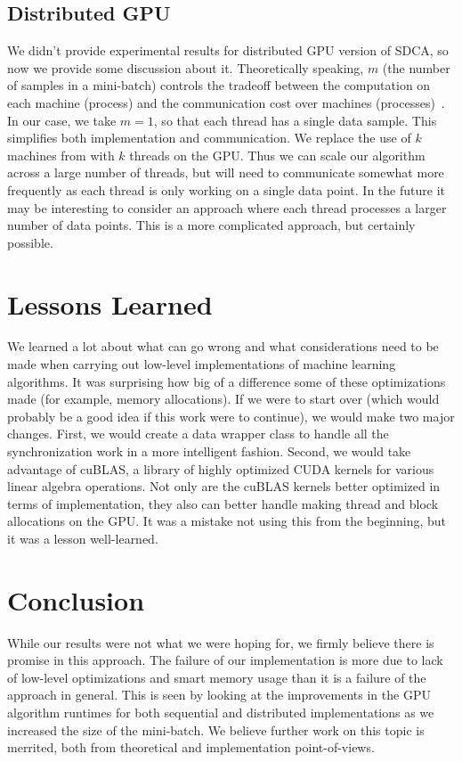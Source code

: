 \documentclass{article}
\begin{document}
\subsection{Distributed GPU}
We didn't provide experimental results for distributed GPU version of SDCA, so
now we provide some discussion about it. Theoretically speaking, $m$ (the
number of samples in a mini-batch) controls the tradeoff between the
computation on each machine (process) 
and the communication cost over machines
(processes)~\cite{yang2013trading,yang2013analysis}. In our case, we take $m =
1$, so that each thread has a single data sample. This simplifies both
implementation and communication. We replace the use of $k$
machines from \cite{yang2013trading} with $k$ threads on the GPU. Thus we can
scale our algorithm across a large number of threads, but will need to
communicate somewhat more frequently as each thread is only working on a single
data point. In the future it may be interesting to consider an approach where
each thread processes a larger number of data points. This is a more
complicated approach, but certainly possible.

\section{Lessons Learned}
We learned a lot about what can go wrong and what considerations need to be
made when carrying out low-level implementations of machine learning
algorithms. It was surprising how big of a difference some of these
optimizations made (for example, memory allocations). If we were to start over
(which would probably be a good idea if this work were to continue), we would
make two major changes. First, we would create a data wrapper class to handle
all the synchronization work in a more intelligent fashion. Second, we would
take advantage of cuBLAS, a library of highly optimized CUDA kernels for
various linear algebra operations. Not only are the cuBLAS kernels better
optimized in terms of implementation, they also can better handle making thread
and block allocations on the GPU. It was a mistake not using this from the
beginning, but it was a lesson well-learned.

\section{Conclusion}
While our results were not what we were hoping for, we firmly believe there is
promise in this approach. The failure of our implementation is more due to lack
of low-level optimizations and smart memory usage than it is a failure of the
approach in general. This is seen by looking at the improvements in the GPU
algorithm runtimes for both sequential and distributed implementations as we
increased the size of the mini-batch. We believe further work on this topic is
merrited, both from theoretical and implementation point-of-views.
\end{document}

